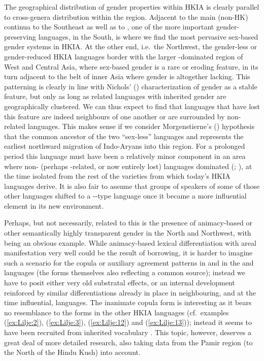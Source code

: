 \documentclass[output=collectionpaper]{langsci/langscibook}
\begin{document}
The geographical distribution of gender properties within HKIA is clearly parallel to cross-genera distribution within the region. Adjacent to the main (non-HK)  continua to the Southeast as well as to , one of the more important gender-preserving  languages, in the South, is where we find the most pervasive sex-based gender systems in HKIA. At the other end, i.e.\ the Northwest, the gender-less or gender-reduced HKIA languages border with the larger -dominated region of West and Central Asia, where sex-based gender is a rare or eroding feature, in its turn adjacent to the  belt of inner Asia where gender is altogether lacking. This patterning is clearly in line with Nichols' (\citeyear[303]{Nichols2003}) characterization of gender as a stable feature, but only as long as related languages with inherited gender are geographically clustered. We can thus expect to find that languages that have lost this feature are indeed neighbours of one another or are surrounded by non-related languages. This makes sense if we consider Morgenstierne's (\citeyear[51]{Morgenstierne1932}) hypothesis that the common ancestor of the two ``sex-less'' languages  and  represents the earliest northward migration of Indo-Aryans into this region. For a prolonged period this language must have been a relatively minor component in an area where non- (perhaps -related, or now entirely lost) languages dominated (\citealt{Tikkanen1988}; \citealt[92--94]{Parpola2002}), at the time isolated from the rest of the  varieties from which today's HKIA languages derive. It is also fair to assume that groups of speakers of some of those other languages shifted to a --type language once it became a more influential element in its new environment.

Perhaps, but not necessarily, related to this is the presence of animacy-based or other semantically highly transparent gender in the North and Northwest, with  being an obvious example. While animacy-based lexical differentiation with areal manifestation very well could be the result of borrowing, it is harder to imagine such a scenario for the copula or auxiliary agreement patterns in  and in the  and  languages (the forms themselves also reflecting a common source); instead we have to posit either very old substratal effects, or an internal development reinforced by similar differentiations already in place in neighbouring, and at the time influential, languages. The  inanimate copula form is interesting as it bears no resemblance to the forms in the other HKIA languages (cf.\ examples (\ref{ex:Lilje:2}), (\ref{ex:Lilje:3}), (\ref{ex:Lilje:12}) and (\ref{ex:Lilje:13})); instead it seems to have been recruited from inherited vocabulary \citep[138]{Morgenstierne1942}. This topic, however, deserves a great deal of more detailed research, also taking data from the Pamir region (to the North of the Hindu Kush) into account.
\end{document}
